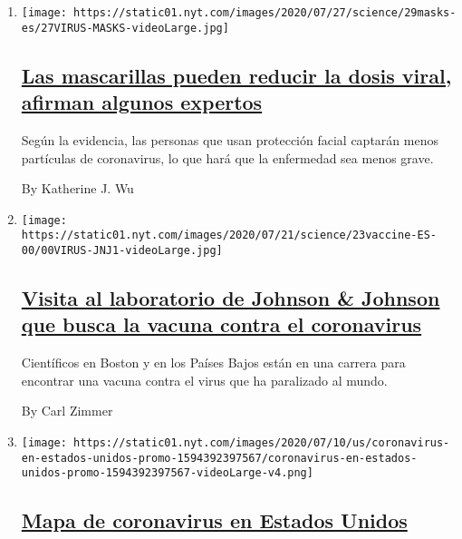 \begin{enumerate}
\def\labelenumi{\arabic{enumi}.}
\item
  \texttt{[image: https://static01.nyt.com/images/2020/07/27/science/29masks-es/27VIRUS-MASKS-videoLarge.jpg]}

  \hypertarget{las-mascarillas-pueden-reducir-la-dosis-viral-afirman-algunos-expertos}{%
  \subsection{\texorpdfstring{\href{/es/2020/07/29/espanol/ciencia-y-tecnologia/proteccion-cubrebocas-coronavirus.html}{Las
  mascarillas pueden reducir la dosis viral, afirman algunos
  expertos}}{Las mascarillas pueden reducir la dosis viral, afirman algunos expertos}}\label{las-mascarillas-pueden-reducir-la-dosis-viral-afirman-algunos-expertos}}

  Según la evidencia, las personas que usan protección facial captarán
  menos partículas de coronavirus, lo que hará que la enfermedad sea
  menos grave.

  By Katherine J. Wu
\item
  \texttt{[image: https://static01.nyt.com/images/2020/07/21/science/23vaccine-ES-00/00VIRUS-JNJ1-videoLarge.jpg]}

  \hypertarget{visita-al-laboratorio-de-johnson--johnson-que-busca-la-vacuna-contra-el-coronavirus}{%
  \subsection{\texorpdfstring{\href{/es/2020/07/23/espanol/ciencia-y-tecnologia/vacuna-coronavirus.html}{Visita
  al laboratorio de Johnson \& Johnson que busca la vacuna contra el
  coronavirus}}{Visita al laboratorio de Johnson \& Johnson que busca la vacuna contra el coronavirus}}\label{visita-al-laboratorio-de-johnson--johnson-que-busca-la-vacuna-contra-el-coronavirus}}

  Científicos en Boston y en los Países Bajos están en una carrera para
  encontrar una vacuna contra el virus que ha paralizado al mundo.

  By Carl Zimmer
\item
  \texttt{[image: https://static01.nyt.com/images/2020/07/10/us/coronavirus-en-estados-unidos-promo-1594392397567/coronavirus-en-estados-unidos-promo-1594392397567-videoLarge-v4.png]}

  \hypertarget{mapa-de-coronavirus-en-estados-unidos}{%
  \subsection{\texorpdfstring{\href{/es/interactive/2020/espanol/mundo/coronavirus-en-estados-unidos.html}{Mapa
  de coronavirus en Estados
  Unidos}}{Mapa de coronavirus en Estados Unidos}}\label{mapa-de-coronavirus-en-estados-unidos}}


\end{enumerate}
